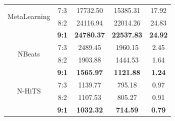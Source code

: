 \begin{table}[H]
\begin{tabular}{|c|c|c|c|c|}
         \hline
         \multirow{2}{*}{MetaLearning} & 7:3 & 17732.50&15385.31&17.92\\ & 8:2 & 24116.94&22014.26&24.83 \\ & \textbf{9:1} & \textbf{24780.37} & \textbf{22537.83} & \textbf{24.92}\\
         \hline
         \multirow{2}{*}{NBeats} & 7:3 & 2489.45&1960.15&2.45\\ & 8:2 & 1903.88&1444.53&1.64 \\ & \textbf{9:1} & \textbf{1565.97} & \textbf{1121.88} & \textbf{1.24}\\
         \hline
         \multirow{2}{*}{N-HiTS} & 7:3 & 1139.77&795.18&0.97\\ & 8:2 & 1107.53&805.27&0.91 \\ & \textbf{9:1} & \textbf{1032.32} & \textbf{714.59} & \textbf{0.79}\\
         \hline
    \end{tabular}
    \label{vcbresult}
\end{table}

